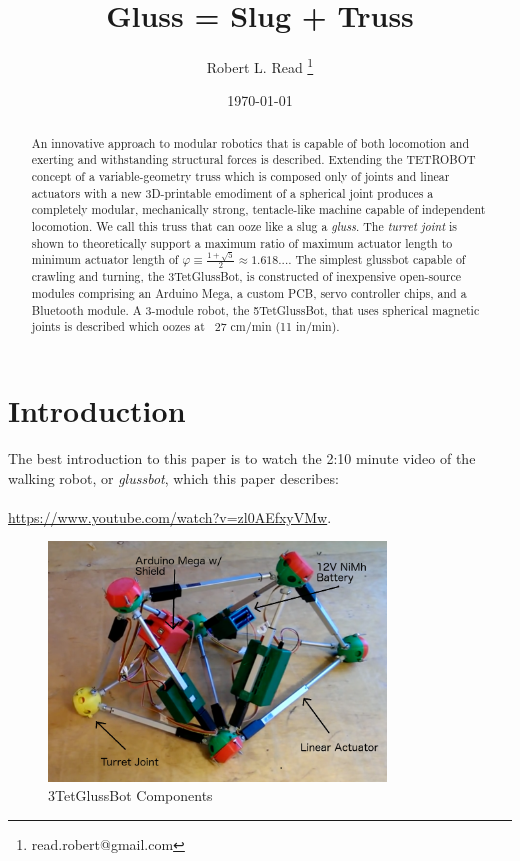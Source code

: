 \documentclass[11pt]{article}
\title{Gluss = Slug + Truss}
\author{Robert L. Read
  \thanks{read.robert@gmail.com}
}
\affil{Founder, Public Invention, an educational non-profit.}
\date{\today}
\begin{document}
\maketitle


\begin{abstract}
  An innovative approach to modular robotics that is capable of both locomotion and exerting and
  withstanding structural forces is described.
  Extending the TETROBOT\cite{sanderson1996modular,lee2002dynamic,lee1999dynamics} concept of a variable-geometry
  truss which is composed only of joints and linear actuators
  with a new 3D-printable emodiment of a
  spherical joint\cite{song2003spherical}
  produces a completely modular, mechanically strong, tentacle-like machine capable of independent locomotion.
  We call this truss that can ooze like a slug a \emph{gluss}.
  The \emph{turret joint} is shown to theoretically support a maximum ratio of maximum actuator length to
  minimum actuator length of  $\varphi \equiv \frac{1 + \sqrt{5}}{2} \approx 1.618...$.
  The simplest glussbot capable of crawling and turning, the 3TetGlussBot, is constructed of
  inexpensive open-source modules comprising an Arduino Mega, a custom PCB, servo controller chips, and a Bluetooth module.
  A 3-module robot, the 5TetGlussBot, that uses spherical magnetic joints is described which oozes at ~27 cm/min (11 in/min).
\end{abstract}


\section{Introduction}

The best introduction to this paper is to watch the 2:10 minute video of the
walking robot, or \emph{glussbot}, which this paper describes:\\
\\
\indent \url{https://www.youtube.com/watch?v=zl0AEfxyVMw}.\\

\begin{figure}[H]
  \centering
    \includegraphics[width=0.8\textwidth]{figures/3TetGlussBotPhotoAnnotated.png}
    \caption[3TetGlussBot Components]{3TetGlussBot Components}
      \label{annotated}
\end{figure}
\end{document}
